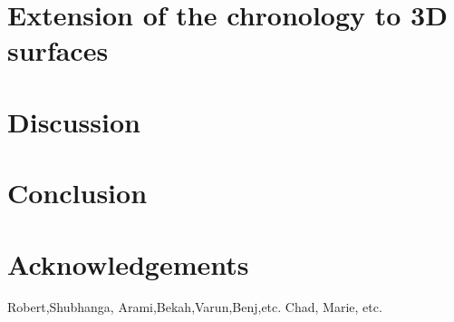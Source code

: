 \documentclass[letterpaper]{igs}
\begin{document}
\section{Extension of the chronology to 3D surfaces}\label{layersurfaces}

\section{Discussion}\label{discussion}

\section{Conclusion}\label{conclusion}

\section{Acknowledgements}
Robert,Shubhanga, Arami,Bekah,Varun,Benj,etc.
Chad, Marie, etc.



\end{document}
